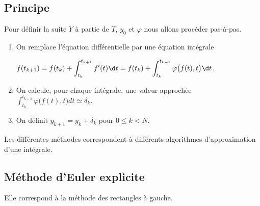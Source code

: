 \subsection{Principe}
Pour définir la suite $Y$ à  partie de $T$, $y_0$ et $\varphi$ nous allons procéder pas-à-pas.
\begin{enumerate}
  \item On remplace l'équation différentielle par une équation intégrale 
  
$\displaystyle f(t_{k+1})= f(t_k) + \int_{t_k}^{t_{k+1}} f'(t) \d t= f(t_k) + \int_{t_k}^{t_{k+1}}  \varphi\bigl(f(t),t \bigr) \d t$.
\item On calcule, pour chaque intégrale, une valeur approchée
$\displaystyle \int_{t_k}^{t_{k+1}}  \varphi\bigl(f(t),t \bigr) d t \simeq \delta_k$.
\item On définit  $y_{k+1}=y_k+\delta_k$ pour $0\le k < N$.
\end{enumerate}
Les différentes méthodes correspondent à différents algorithmes d'approximation d'une intégrale.
\subsection{Méthode d'Euler explicite}
Elle correspond à la méthode des rectangles à gauche.

